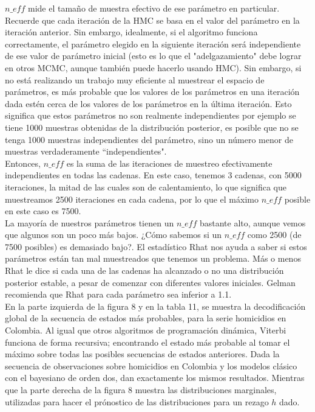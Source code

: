\documentclass[a4paper]{article}\usepackage[]{graphicx}\usepackage[]{color}
\begin{document}
$n\_eff$ mide el tamaño de muestra efectivo de ese parámetro en particular. Recuerde que cada iteración de la HMC se basa en el valor del parámetro en la iteración anterior. Sin embargo, idealmente, si el algoritmo funciona correctamente, el parámetro elegido en la siguiente iteración será independiente de ese valor de parámetro inicial (esto es lo que el "adelgazamiento" debe lograr en otros MCMC, aunque también puede hacerlo usando HMC). Sin embargo, si no está realizando un trabajo muy eficiente al muestrear el espacio de parámetros, es más probable que los valores de los parámetros en una iteración dada estén cerca de los valores de los parámetros en la última iteración. Esto significa que estos parámetros no son realmente independientes por ejemplo se tiene 1000 muestras obtenidas de la distribución posterior, es posible que no se tenga 1000 muestras independientes del parámetro, sino un número menor de muestras verdaderamente ``independientes".
\\
Entonces, $n\_eff$ es la suma de las iteraciones de muestreo efectivamente independientes en todas las cadenas. En este caso, tenemos 3 cadenas, con 5000 iteraciones, la mitad de las cuales son de calentamiento, lo que significa que muestreamos 2500 iteraciones en cada cadena, por lo que el máximo $n\_eff$ posible en este caso es 7500.
\\
La mayoría de nuestros parámetros tienen un $n\_eff$ bastante alto, aunque vemos que algunos son un poco más bajos. ¿Cómo sabemos si un $n\_eff$ como 2500 (de 7500 posibles) es demasiado bajo?. El estadístico Rhat nos ayuda a saber si estos parámetros están tan mal muestreados que tenemos un problema. Más o menos Rhat le dice si cada una de las cadenas ha alcanzado o no una distribución posterior estable, a pesar de comenzar con diferentes valores iniciales. Gelman recomienda que Rhat para cada parámetro sea inferior a 1.1.
\\
En la parte izquierda de la figura 8 y en la tabla 11, se muestra la decodificación global de la secuencia de estados más probables, para la serie homicidios en Colombia. Al igual que otros algoritmos de programación dinámica, Viterbi funciona de forma recursiva; encontrando el estado más probable al tomar el máximo sobre todas las posibles secuencias de estados anteriores. Dada la secuencia de observaciones sobre homicidios en Colombia y los modelos clásico con el bayesiano de orden dos, dan exactamente los mismos resultados. Mientras que la parte derecha de la figura 8 muestra las distribuciones marginales, utilizadas para hacer el prónostico de las distribuciones para un rezago $h$ dado.
\end{document}
